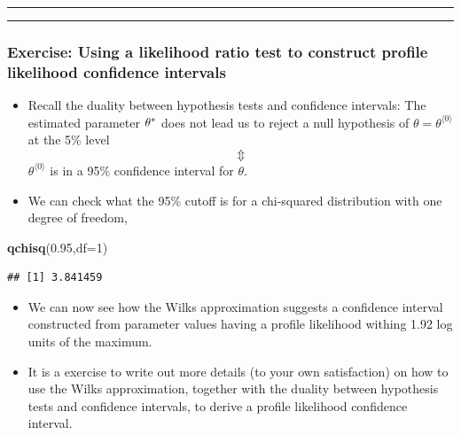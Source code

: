 \documentclass[]{article}
\newenvironment{Shaded}{\begin{snugshade}}{\end{snugshade}}
\newcommand{\KeywordTok}[1]{\textcolor[rgb]{0.13,0.29,0.53}{\textbf{#1}}}
\newcommand{\DataTypeTok}[1]{\textcolor[rgb]{0.13,0.29,0.53}{#1}}
\newcommand{\DecValTok}[1]{\textcolor[rgb]{0.00,0.00,0.81}{#1}}
\newcommand{\FloatTok}[1]{\textcolor[rgb]{0.00,0.00,0.81}{#1}}
\newcommand{\NormalTok}[1]{#1}
\begin{document}
\begin{center}\rule{0.5\linewidth}{\linethickness}\end{center}

\begin{center}\rule{0.5\linewidth}{\linethickness}\end{center}

\subsubsection{Exercise: Using a likelihood ratio test to construct
profile likelihood confidence
intervals}\label{exercise-using-a-likelihood-ratio-test-to-construct-profile-likelihood-confidence-intervals}

\begin{itemize}
\item
  Recall the duality between hypothesis tests and confidence intervals:
  The estimated parameter \(\theta^*\) does not lead us to reject a
  null hypothesis of \(\theta=\theta^{\langle 0\rangle}\) at the 5\%
  level \[\Updownarrow\] \(\theta^{\langle 0\rangle}\) is in a 95\%
  confidence interval for \(\theta\).
\item
  We can check what the 95\% cutoff is for a chi-squared distribution
  with one degree of freedom,
\end{itemize}

\begin{Shaded}
\begin{Highlighting}[]
\KeywordTok{qchisq}\NormalTok{(}\FloatTok{0.95}\NormalTok{,}\DataTypeTok{df=}\DecValTok{1}\NormalTok{)}
\end{Highlighting}
\end{Shaded}

\begin{verbatim}
## [1] 3.841459
\end{verbatim}

\begin{itemize}
\item
  We can now see how the Wilks approximation suggests a confidence
  interval constructed from parameter values having a profile likelihood
  withing 1.92 log units of the maximum.
\item
  It is a exercise to write out more details (to your own satisfaction)
  on how to use the Wilks approximation, together with the duality
  between hypothesis tests and confidence intervals, to derive a profile
  likelihood confidence interval.
\end{itemize}
\end{document}
